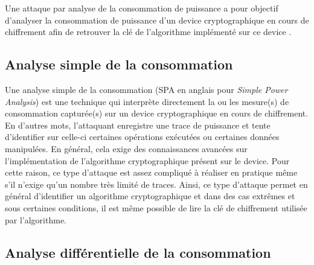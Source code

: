 \documentclass[oneside]{book}
\begin{document}
\vspace{-0.05cm}Une attaque par analyse de la consommation de puissance a pour objectif d'analyser la consommation de puissance d'un device cryptographique en cours de chiffrement afin de retrouver la clé de l'algorithme implémenté sur ce device \cite{mangard_power_2007}.

\vspace{-0.15cm}\subsection{Analyse simple de la consommation}
\label{sec:SPA}

\vspace{-0.05cm}Une analyse simple de la consommation (SPA en anglais pour \textit{Simple Power Analysis}) \cite{mangard_power_2007} est une technique qui interprète directement la ou les mesure(s) de consommation capturée(s) sur un device cryptographique en cours de chiffrement. En d'autres mots, l'attaquant enregistre une trace de puissance et tente d'identifier sur celle-ci certaines opérations exécutées ou certaines données manipulées. En général, cela exige des connaissances avancées sur l'implémentation de l'algorithme cryptographique présent sur le device. Pour cette raison, ce type d'attaque est assez compliqué à réaliser en pratique même s'il n'exige qu'un nombre très limité de traces. Ainsi, ce type d'attaque permet en général d'identifier un algorithme cryptographique et dans des cas extrêmes et sous certaines conditions, il est même possible de lire la clé de chiffrement utilisée par l'algorithme.


\vspace{-0.15cm}\subsection{Analyse différentielle de la consommation}
\label{sec:DPA}
\end{document}
